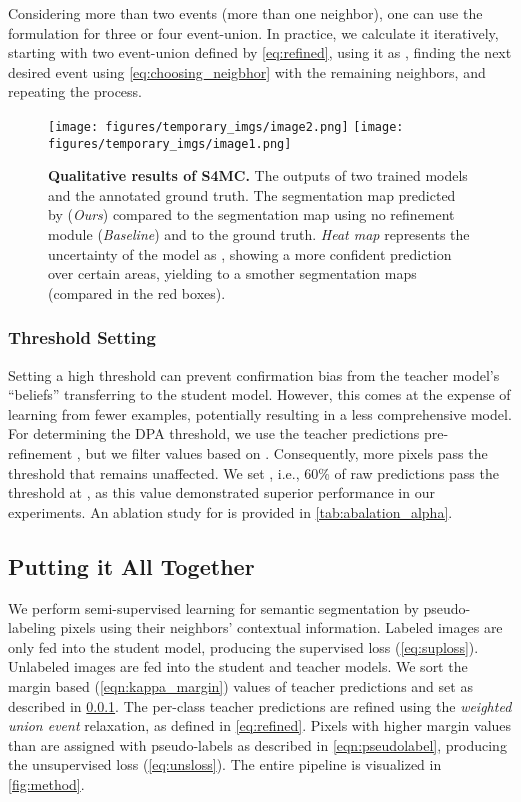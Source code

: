 \documentclass{article}
\begin{document}
Considering more than two events (more than one neighbor), one can use the formulation for three or four event-union. In practice, we calculate it iteratively, starting with two event-union defined by \cref{eq:refined}, using it as , finding the next desired event using \cref{eq:choosing_neigbhor} with the remaining neighbors, and repeating the process.


\begin{figure*}
	\centering	\texttt{[image: figures/temporary\_imgs/image2.png]}
    \texttt{[image: figures/temporary\_imgs/image1.png]}
	\caption{\textbf{Qualitative results of S4MC.} The outputs of two trained models and the annotated ground truth. The segmentation map predicted by \methodname{} (\textit{Ours}) compared to the segmentation map using no refinement module (\textit{Baseline}) and  to the ground truth. \textit{Heat map} represents the uncertainty of the model as , showing a more confident prediction over certain areas, yielding to a smother segmentation maps (compared in the red boxes).}
 \label{fig:neigbors}
\end{figure*}

\subsubsection{Threshold Setting }\label{sec:th_set}
Setting a high threshold can prevent confirmation bias from the teacher model's ``beliefs'' transferring to the student model. However, this comes at the expense of learning from fewer examples, potentially resulting in a less comprehensive model. 
For determining the DPA threshold, we use the teacher predictions pre-refinement , but we filter values based on . Consequently, more pixels pass the threshold that remains unaffected. We set , i.e., 60\% of raw predictions pass the threshold at , as this value demonstrated superior performance in our experiments. An ablation study for  is provided in \cref{tab:abalation_alpha}. 



\subsection{Putting it All Together}

We perform semi-supervised learning for semantic segmentation by pseudo-labeling pixels using their neighbors' contextual information. 
Labeled images are only fed into the student model, producing the supervised loss (\cref{eq:suploss}). Unlabeled images are fed into the student and teacher models. We sort the margin based  (\cref{eqn:kappa_margin}) values of teacher predictions and set  as described in \cref{sec:th_set}.
The per-class teacher predictions are refined using the \textit{weighted union event} relaxation, as defined in \cref{eq:refined}. Pixels with  higher margin values than   are assigned with pseudo-labels as described in \cref{eqn:pseudolabel}, producing the unsupervised loss (\cref{eq:unsloss}). The entire pipeline is visualized in \cref{fig:method}.
\end{document}
